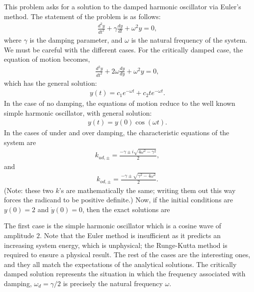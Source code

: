 \documentclass[letter,12pt]{article}
\begin{document}
This problem asks for a solution to the damped harmonic oscillator via Euler's method. The statement of the problem is as follows:
\begin{align}
\frac{d^2 y}{dt^2} + \gamma \frac{dy}{dt} + \omega^2 y = 0,
\end{align}
where $\gamma$ is the damping parameter, and $\omega$ is the natural frequency of the system. We must be careful with the different cases. For the critically damped case, the equation of motion becomes,
\begin{align}
\frac{d^2 y}{dt^2} + 2\omega \frac{dy}{dy} + \omega^2 y = 0,
\end{align}
which has the general solution:
\begin{align}
y(t) = c_1 e^{-\omega t} + c_2 t e^{-\omega t}.
\end{align}
In the case of no damping, the equations of motion reduce to the well known simple harmonic oscillator, with general solution:
\begin{align}
y(t) = y(0) \cos(\omega t).
\end{align}
In the cases of under and over damping, the characteristic equations of the system are
\begin{align}
k_{ud,\pm} = \frac{-\gamma \pm i\sqrt{4\omega^2 - \gamma^2}}{2},
\end{align}
and
\begin{align}
 k_{od,\pm} = \frac{-\gamma \pm \sqrt{\gamma^2-4\omega^2}}{2}.
\end{align}
(Note: these two $k$'s are mathematically the same; writing them out this way forces the radicand to be positive definite.) Now, if the initial conditions are $y(0)=2$ and $\dot{y}(0)=0$, then the exact solutions are
\begin{enumerate}
\item{$\gamma = 0$: $y(t)=2\cos(\omega t)$}
\item{$\gamma = 2\omega$: $y(t) = 2 e^{-\omega t} (\omega t + 1)$}
\item{$\gamma < 2\omega = 2$: $y(t) = 2 e^{-t} \left(\cos(\frac{1}{2} t\sqrt{4\omega^2 - \gamma^2})+\frac{\gamma}{\sqrt{4\omega^2 - \gamma^2}}\sin(\frac{1}{2} t\sqrt{4\omega^2 - \gamma^2})\right)$
\item{$\gamma > 2\omega = 3$: $y(t) = 2 e^{-\frac{3t}{2}} \left(\cosh(\frac{1}{2} t\sqrt{\gamma^2-4\omega^2})+\frac{\gamma}{\sqrt{\gamma^2-4\omega^2}}\sinh(\frac{1}{2} t\sqrt{\gamma^2-4\omega^2})\right)$
\end{enumerate}

The first case is the simple harmonic oscillator which is a cosine wave of amplitude $2$. Note that the Euler method is insufficient as it predicts an increasing system energy, which is unphysical; the Runge-Kutta method is required to ensure a physical result. The rest of the cases are the interesting ones, and they all match the expectations of the analytical solutions. The critically damped solution represents the situation in which the frequency associated with damping, $\omega_d = \gamma/2$ is precisely the natural frequency $\omega$. 
\end{document}

